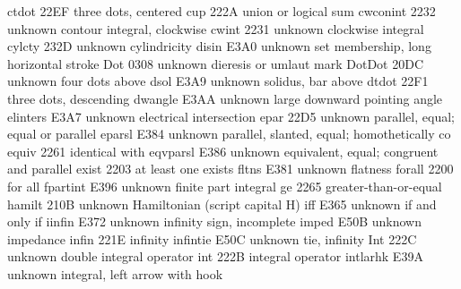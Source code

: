  ctdot                            22EF {\cdots} three dots, centered
 cup                              222A {\cup} union or logical sum
 cwconint                         2232 {unknown} contour integral, clockwise
 cwint                            2231 {unknown} clockwise integral
 cylcty                           232D {unknown} cylindricity
 disin                            E3A0 {unknown} set membership, long horizontal stroke
 Dot                              0308 {unknown} dieresis or umlaut mark
 DotDot                           20DC {unknown} four dots above
 dsol                             E3A9 {unknown} solidus, bar above
 dtdot                            22F1 {\ddots} three dots, descending
 dwangle                          E3AA {unknown} large downward pointing angle
 elinters                         E3A7 {unknown} electrical intersection
 epar                             22D5 {unknown} parallel, equal; equal or parallel
 eparsl                           E384 {unknown} parallel, slanted, equal; homothetically co
 equiv                            2261 {\equiv} identical with
 eqvparsl                         E386 {unknown} equivalent, equal; congruent and parallel
 exist                            2203 {\exists} at least one exists
 fltns                            E381 {unknown} flatness
 forall                           2200 {\forall} for all
 fpartint                         E396 {unknown} finite part integral
 ge                               2265 {\geq} greater-than-or-equal
 hamilt                           210B {unknown} Hamiltonian (script capital H)
 iff                              E365 {unknown} if and only if
 iinfin                           E372 {unknown} infinity sign, incomplete
 imped                            E50B {unknown} impedance
 infin                            221E {\infty} infinity
 infintie                         E50C {unknown} tie, infinity
 Int                              222C {unknown} double integral operator
 int                              222B {\int} integral operator
 intlarhk                         E39A {unknown} integral, left arrow with hook
